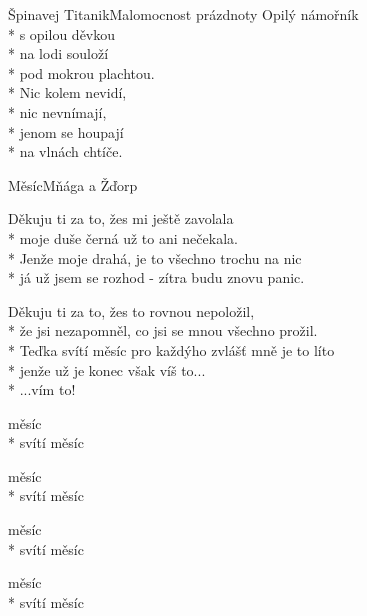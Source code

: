 \documentclass[10.5pt]{book}
\begin{document}
\begin{poem}{Špinavej Titanik}{Malomocnost prázdnoty}
Opilý námořník\\*
s opilou děvkou\\*
na lodi souloží\\*
pod mokrou plachtou.\\*
Nic kolem nevidí,\\*
nic nevnímají,\\*
jenom se houpají\\*
na vlnách chtíče.

\end{poem}

\begin{poem}{Měsíc}{Mňága a Žďorp}

\settowidth{\versewidth}{teďka svítí měsíc pro každýho zvlášť mně je to líto}

Děkuju ti za to, žes mi ještě zavolala\\*
moje duše černá už to ani nečekala.\\*
Jenže moje drahá, je to všechno trochu na nic\\*
já už jsem se rozhod - zítra budu znovu panic. 

Děkuju ti za to, žes to rovnou nepoložil,\\*
že jsi nezapomněl, co jsi se mnou všechno prožil.\\*
Teďka svítí měsíc pro každýho zvlášť mně je to líto\\*
jenže už je konec však víš to...\\*
...vím to!

měsíc\\*
svítí měsíc

měsíc\\*
svítí měsíc

měsíc\\*
svítí měsíc

měsíc\\*
svítí měsíc

\end{poem}
\end{document}
